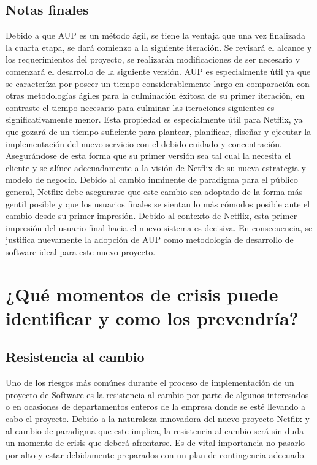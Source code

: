 \documentclass{article}
\begin{document}
\subsection{Notas finales}
Debido a que AUP es un método ágil, se tiene la ventaja que 
una vez finalizada la cuarta etapa, se dará comienzo a la siguiente
iteración. Se revisará el alcance y los requerimientos del proyecto,
se realizarán modificaciones de ser necesario y comenzará el
desarrollo de la siguiente versión. AUP es especialmente útil ya que
se caracteríza por poseer un tiempo considerablemente largo en 
comparación con otras metodologías ágiles para la culminación 
éxitosa de su primer iteración, en contraste el tiempo necesario 
para culminar las iteraciones siguientes es significativamente menor.
Esta propiedad es especialmente útil para Netflix, ya que gozará 
de un tiempo suficiente para plantear, planificar, diseñar y ejecutar
la implementación del nuevo servicio con el debido cuidado y 
concentración. Asegurándose de esta forma que su primer versión sea tal
cual la necesita el cliente y se alínee adecuadamente a la visión de Netflix de 
su nueva estrategia y modelo de negocio. Debido al cambio 
inminente de paradigma para el público general, Netflix debe
asegurarse que este cambio sea adoptado de la forma más gentil posible
y que los usuarios finales se sientan lo más cómodos posible ante
el cambio desde su primer impresión. Debido al contexto de Netflix,
esta primer impresión del usuario final hacia el nuevo sistema es
decisiva. En consecuencia, se justifica nuevamente la adopción de AUP
como metodología de desarrollo de software ideal para este nuevo proyecto.

\section{¿Qué momentos de crisis puede identificar y como los
prevendría?}
\subsection{Resistencia al cambio}
Uno de los riesgos más comúnes durante el proceso de implementación
de un proyecto de Software es la resistencia al cambio por parte
de algunos interesados o en ocasiones de departamentos enteros
de la empresa donde se esté llevando a cabo el proyecto. Debido
a la naturaleza innovadora del nuevo proyecto Netflix y al cambio
de paradigma que este implica, la resistencia al cambio será sin
duda un momento de crisis que deberá afrontarse. Es de vital
importancia no pasarlo por alto y estar debidamente preparados con
un plan de contingencia adecuado.
\end{document}
